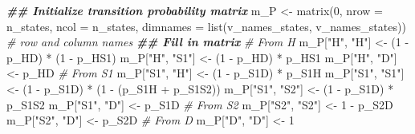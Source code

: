 \documentclass[
]{article}
\newenvironment{Shaded}{\begin{snugshade}}{\end{snugshade}}
\newcommand{\AttributeTok}[1]{\textcolor[rgb]{0.77,0.63,0.00}{#1}}
\newcommand{\CommentTok}[1]{\textcolor[rgb]{0.56,0.35,0.01}{\textit{#1}}}
\newcommand{\DecValTok}[1]{\textcolor[rgb]{0.00,0.00,0.81}{#1}}
\newcommand{\DocumentationTok}[1]{\textcolor[rgb]{0.56,0.35,0.01}{\textbf{\textit{#1}}}}
\newcommand{\FunctionTok}[1]{\textcolor[rgb]{0.00,0.00,0.00}{#1}}
\newcommand{\NormalTok}[1]{#1}
\newcommand{\OtherTok}[1]{\textcolor[rgb]{0.56,0.35,0.01}{#1}}
\newcommand{\SpecialCharTok}[1]{\textcolor[rgb]{0.00,0.00,0.00}{#1}}
\newcommand{\StringTok}[1]{\textcolor[rgb]{0.31,0.60,0.02}{#1}}
\begin{document}
\begin{Shaded}
\begin{Highlighting}[]
\DocumentationTok{\#\# Initialize transition probability matrix}
\NormalTok{m\_P }\OtherTok{\textless{}{-}} \FunctionTok{matrix}\NormalTok{(}\DecValTok{0}\NormalTok{, }
              \AttributeTok{nrow =}\NormalTok{ n\_states, }\AttributeTok{ncol =}\NormalTok{ n\_states, }
              \AttributeTok{dimnames =} \FunctionTok{list}\NormalTok{(v\_names\_states, v\_names\_states)) }\CommentTok{\# row and column names}
\DocumentationTok{\#\# Fill in matrix}
\CommentTok{\# From H}
\NormalTok{m\_P[}\StringTok{"H"}\NormalTok{, }\StringTok{"H"}\NormalTok{]   }\OtherTok{\textless{}{-}}\NormalTok{ (}\DecValTok{1} \SpecialCharTok{{-}}\NormalTok{ p\_HD) }\SpecialCharTok{*}\NormalTok{ (}\DecValTok{1} \SpecialCharTok{{-}}\NormalTok{ p\_HS1)}
\NormalTok{m\_P[}\StringTok{"H"}\NormalTok{, }\StringTok{"S1"}\NormalTok{]  }\OtherTok{\textless{}{-}}\NormalTok{ (}\DecValTok{1} \SpecialCharTok{{-}}\NormalTok{ p\_HD) }\SpecialCharTok{*}\NormalTok{ p\_HS1}
\NormalTok{m\_P[}\StringTok{"H"}\NormalTok{, }\StringTok{"D"}\NormalTok{]   }\OtherTok{\textless{}{-}}\NormalTok{ p\_HD}
\CommentTok{\# From S1}
\NormalTok{m\_P[}\StringTok{"S1"}\NormalTok{, }\StringTok{"H"}\NormalTok{]  }\OtherTok{\textless{}{-}}\NormalTok{ (}\DecValTok{1} \SpecialCharTok{{-}}\NormalTok{ p\_S1D) }\SpecialCharTok{*}\NormalTok{ p\_S1H}
\NormalTok{m\_P[}\StringTok{"S1"}\NormalTok{, }\StringTok{"S1"}\NormalTok{] }\OtherTok{\textless{}{-}}\NormalTok{ (}\DecValTok{1} \SpecialCharTok{{-}}\NormalTok{ p\_S1D) }\SpecialCharTok{*}\NormalTok{ (}\DecValTok{1} \SpecialCharTok{{-}}\NormalTok{ (p\_S1H }\SpecialCharTok{+}\NormalTok{ p\_S1S2))}
\NormalTok{m\_P[}\StringTok{"S1"}\NormalTok{, }\StringTok{"S2"}\NormalTok{] }\OtherTok{\textless{}{-}}\NormalTok{ (}\DecValTok{1} \SpecialCharTok{{-}}\NormalTok{ p\_S1D) }\SpecialCharTok{*}\NormalTok{ p\_S1S2}
\NormalTok{m\_P[}\StringTok{"S1"}\NormalTok{, }\StringTok{"D"}\NormalTok{]  }\OtherTok{\textless{}{-}}\NormalTok{ p\_S1D}
\CommentTok{\# From S2}
\NormalTok{m\_P[}\StringTok{"S2"}\NormalTok{, }\StringTok{"S2"}\NormalTok{] }\OtherTok{\textless{}{-}} \DecValTok{1} \SpecialCharTok{{-}}\NormalTok{ p\_S2D}
\NormalTok{m\_P[}\StringTok{"S2"}\NormalTok{, }\StringTok{"D"}\NormalTok{]  }\OtherTok{\textless{}{-}}\NormalTok{ p\_S2D}
\CommentTok{\# From D}
\NormalTok{m\_P[}\StringTok{"D"}\NormalTok{, }\StringTok{"D"}\NormalTok{]   }\OtherTok{\textless{}{-}} \DecValTok{1}
\end{Highlighting}
\end{Shaded}
\end{document}

